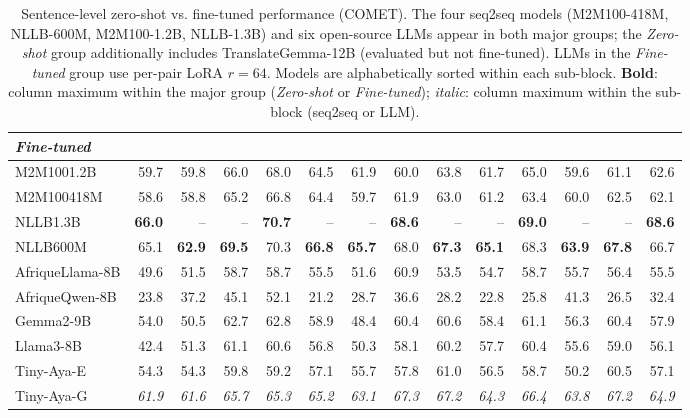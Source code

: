 \begin{table}[t]
\begin{tabular}{lrrrrrrrrrrrrr}
\midrule\midrule
\multicolumn{14}{l}{\textit{Fine-tuned}} \\
\midrule
M2M100\textunderscore{}1.2B & 59.7 & 59.8 & 66.0 & 68.0 & 64.5 & 61.9 & 60.0 & 63.8 & 61.7 & 65.0 & 59.6 & 61.1 & 62.6 \\
M2M100\textunderscore{}418M & 58.6 & 58.8 & 65.2 & 66.8 & 64.4 & 59.7 & 61.9 & 63.0 & 61.2 & 63.4 & 60.0 & 62.5 & 62.1 \\
NLLB\textunderscore{}1.3B & \textbf{66.0} & -- & -- & \textbf{70.7} & -- & -- & \textbf{68.6} & -- & -- & \textbf{69.0} & -- & -- & \textbf{68.6} \\
NLLB\textunderscore{}600M & 65.1 & \textbf{62.9} & \textbf{69.5} & 70.3 & \textbf{66.8} & \textbf{65.7} & 68.0 & \textbf{67.3} & \textbf{65.1} & 68.3 & \textbf{63.9} & \textbf{67.8} & 66.7 \\
\midrule
AfriqueLlama-8B & 49.6 & 51.5 & 58.7 & 58.7 & 55.5 & 51.6 & 60.9 & 53.5 & 54.7 & 58.7 & 55.7 & 56.4 & 55.5 \\
AfriqueQwen-8B & 23.8 & 37.2 & 45.1 & 52.1 & 21.2 & 28.7 & 36.6 & 28.2 & 22.8 & 25.8 & 41.3 & 26.5 & 32.4 \\
Gemma2-9B & 54.0 & 50.5 & 62.7 & 62.8 & 58.9 & 48.4 & 60.4 & 60.6 & 58.4 & 61.1 & 56.3 & 60.4 & 57.9 \\
Llama3-8B & 42.4 & 51.3 & 61.1 & 60.6 & 56.8 & 50.3 & 58.1 & 60.2 & 57.7 & 60.4 & 55.6 & 59.0 & 56.1 \\
Tiny-Aya-E & 54.3 & 54.3 & 59.8 & 59.2 & 57.1 & 55.7 & 57.8 & 61.0 & 56.5 & 58.7 & 50.2 & 60.5 & 57.1 \\
Tiny-Aya-G & \emph{61.9} & \emph{61.6} & \emph{65.7} & \emph{65.3} & \emph{65.2} & \emph{63.1} & \emph{67.3} & \emph{67.2} & \emph{64.3} & \emph{66.4} & \emph{63.8} & \emph{67.2} & \emph{64.9} \\
\bottomrule
\end{tabular}
\caption{Sentence-level zero-shot vs. fine-tuned performance (COMET). The four seq2seq models (M2M100-418M, NLLB-600M, M2M100-1.2B, NLLB-1.3B) and six open-source LLMs appear in both major groups; the \textit{Zero-shot} group additionally includes TranslateGemma-12B (evaluated but not fine-tuned). LLMs in the \textit{Fine-tuned} group use per-pair LoRA $r{=}64$. Models are alphabetically sorted within each sub-block. \textbf{Bold}: column maximum within the major group (\textit{Zero-shot} or \textit{Fine-tuned}); \emph{italic}: column maximum within the sub-block (seq2seq or LLM).}
\label{tab:main_zs_ft_comet}
\end{table}
